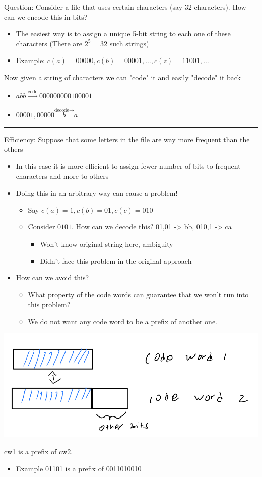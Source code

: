 \documentclass[11pt]{article}
\begin{document}
Question: Consider a file that uses certain characters (say 32 characters). How can we encode this in bits?
\begin{itemize}
\item The easiest way is to assign a unique 5-bit string to each one of these characters (There are \(2^{5}=32\) such strings)
\item Example: \(c(a)=00000, c(b)=00001, \ldots , c(z)=11001, \ldots\)
\end{itemize}
Now given a string of characters we can "code" it and easily "decode" it back
\begin{itemize}
\item \(abb \stackrel{\text{code}}{\rightarrow} 000000000100001\)
\item \(00001,00000 \stackrel{\text{decode}{\rightarrow}} ba\)
\end{itemize}

\noindent\rule{\textwidth}{0.5pt}
\uline{Efficiency}: Suppose that some letters in the file are way more frequent than the others
\begin{itemize}
\item In this case it is more efficient to assign fewer number of bits to frequent characters and more to others
\item Doing this in an arbitrary way can cause a problem!
\begin{itemize}
\item Say \(c(a)=1, c(b)=01, c(c)=010\)
\item Consider \(0101\). How can we decode this? 01,01 -> bb, 010,1 -> ca
\begin{itemize}
\item Won't know original string here, ambiguity
\item Didn't face this problem in the original approach
\end{itemize}
\end{itemize}
\item How can we avoid this?
\begin{itemize}
\item What property of the code words can guarantee that we won't run into this problem?
\item We do not want any code word to be a prefix of another one.
\end{itemize}
\end{itemize}
\begin{center}
\includegraphics[width=.9\linewidth]{./Images/i60.png}
\end{center}
cw1 is a prefix of cw2.
\begin{itemize}
\item Example \uline{01101} is a prefix of \uline{0011010010}
\end{itemize}
\end{document}
